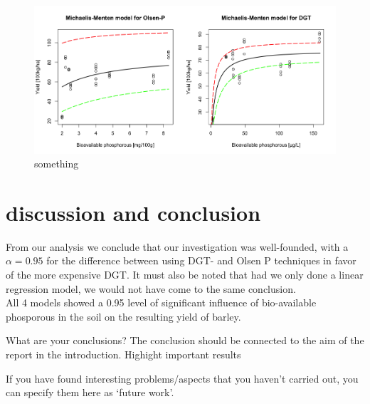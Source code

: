 \documentclass{article}
\begin{document}
\begin{figure}[H]
	\includegraphics[width=\linewidth]{modelsEnv.png}
	\caption{something}
	\label{fig:qqplot}
\end{figure}



\section{discussion and conclusion}

From our analysis we conclude that our investigation was well-founded, with a $\alpha = 0.95$ for the difference between using DGT- and Olsen P techniques in favor of the more expensive DGT. It  must also be noted that had we only done a linear regression model, we would not have come to the same conclusion. \\ All 4 models showed a 0.95 level of significant influence of bio-available phosporous in the soil on the resulting yield of barley.

What are your conclusions? The conclusion should be connected to the aim of the report in the introduction.
	Highight important results
	
If you have found interesting problems/aspects that you haven’t carried out, you can specify them here as ‘future work’.
\end{document}
